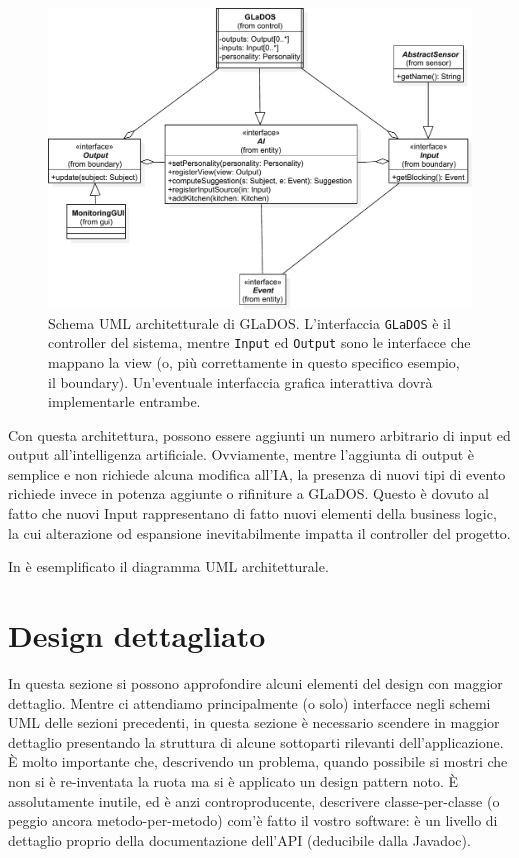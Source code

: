 \documentclass[a4paper,12pt]{report}
\begin{document}
\begin{figure}[!t]
\centering{}
\includegraphics[width=\textwidth]{img/arch}
\caption{Schema UML architetturale di GLaDOS. L'interfaccia \texttt{GLaDOS} è il controller del sistema, mentre \texttt{Input} ed \texttt{Output} sono le interfacce che mappano la view (o, più correttamente in questo specifico esempio, il boundary). Un'eventuale interfaccia grafica interattiva dovrà implementarle entrambe.}
\label{img:goodarch}
\end{figure}

Con questa architettura, possono essere aggiunti un numero arbitrario di input ed output 
all'intelligenza artificiale.
%
Ovviamente, mentre l'aggiunta di output è semplice e non richiede alcuna modifica all'IA, la 
presenza di nuovi tipi di evento richiede invece in potenza aggiunte o rifiniture a GLaDOS.
%
Questo è dovuto al fatto che nuovi Input rappresentano di fatto nuovi elementi della business 
logic, la cui alterazione od espansione inevitabilmente impatta il controller del progetto.

In  è esemplificato il diagramma UML architetturale.


\section{Design dettagliato}

In questa sezione si possono approfondire alcuni elementi del design con maggior dettaglio.
%
Mentre ci attendiamo principalmente (o solo) interfacce negli schemi UML delle sezioni precedenti, in questa sezione è necessario scendere in maggior dettaglio presentando la struttura di alcune sottoparti rilevanti dell'applicazione.
%
È molto importante che, descrivendo un problema, quando possibile si mostri che non si è re-inventata la ruota ma si è applicato un design pattern noto.
%
È assolutamente inutile, ed è anzi controproducente, descrivere classe-per-classe (o peggio ancora metodo-per-metodo) com'è fatto il vostro software: è un livello di dettaglio proprio della documentazione dell'API (deducibile dalla Javadoc).
\end{document}
